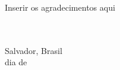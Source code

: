 \begin{agradecimentos}

Inserir os agradecimentos aqui




\ \\
\ \\

\noindent
Salvador, Brasil \hfill \theauthor\\
dia de \mesdeano
\end{agradecimentos}

